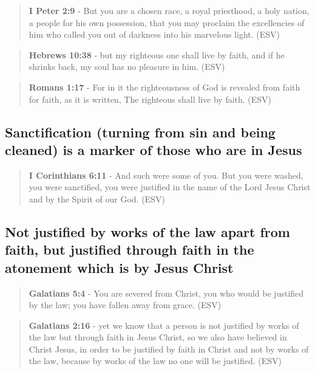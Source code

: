 \documentclass[11pt]{article}
\begin{document}
\begin{quote}
\textbf{I Peter 2:9} - But you are a chosen race, a royal priesthood, a holy nation, a people for his own possession, that you may proclaim the excellencies of him who called you out of darkness into his marvelous light. (ESV)
\end{quote}

\begin{quote}
\textbf{Hebrews 10:38} - but my righteous one shall live by faith, and if he shrinks back, my soul has no pleasure in him. (ESV)
\end{quote}

\begin{quote}
\textbf{Romans 1:17} - For in it the righteousness of God is revealed from faith for faith, as it is written, The righteous shall live by faith. (ESV)
\end{quote}

\subsection{Sanctification (turning from sin and being cleaned) is a marker of those who are in Jesus}
\label{sec:org125e103}

\begin{quote}
\textbf{I Corinthians 6:11} - And such were some of you. But you were washed, you were sanctified, you were justified in the name of the Lord Jesus Christ and by the Spirit of our God. (ESV)
\end{quote}

\subsection{Not justified by works of the law apart from faith, but justified through faith in the atonement which is by Jesus Christ}
\label{sec:org26fc4e6}

\begin{quote}
\textbf{Galatians 5:4} - You are severed from Christ, you who would be justified by the law; you have fallen away from grace. (ESV)
\end{quote}

\begin{quote}
\textbf{Galatians 2:16} - yet we know that a person is not justified by works of the law but through faith in Jesus Christ, so we also have believed in Christ Jesus, in order to be justified by faith in Christ and not by works of the law, because by works of the law no one will be justified. (ESV)
\end{quote}
\end{document}
